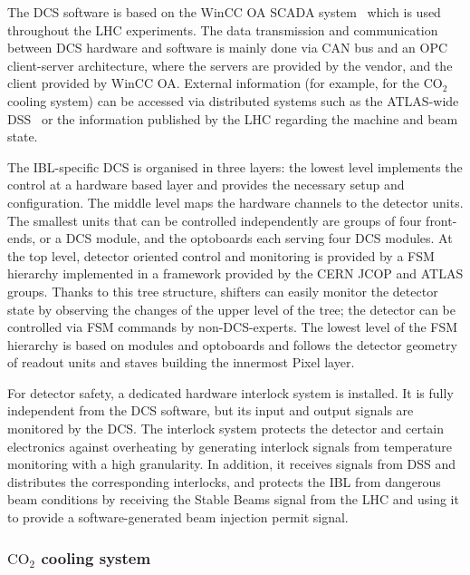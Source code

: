 \documentclass[cernpreprint, atlasdraft=false, UKenglish,british,orcidlogo, texmf, orcidlogo]{atlasdoc}
\begin{document}
The \gls{DCS} software is based on the \gls{WinCC OA} \gls{SCADA} system~\cite{PVSS} which is used throughout the \gls{LHC} experiments. The data transmission and communication between \gls{DCS} hardware and software is mainly done via \gls{CAN} bus and an \gls{OPC} client-server architecture, where the servers are provided by the vendor, and the client provided by \gls{WinCC OA}. External information (for example, for the ${\text{CO}}_2$ cooling system) can be accessed via distributed systems such as the ATLAS-wide \gls{DSS}~\cite{DSS} or the information published by the \gls{LHC} regarding the machine and beam state.
 
The \gls{IBL}-specific \gls{DCS} is organised in three layers: the lowest level implements the control at a hardware based layer and provides the necessary setup and configuration. The middle level maps the hardware channels to the detector units. The smallest units that can be controlled independently are groups of four front-ends, or a \gls{DCS} module, and the optoboards each serving four \gls{DCS} modules. At the top level, detector oriented control and monitoring is provided by a \gls{FSM} hierarchy implemented in a framework provided by the CERN \gls{JCOP} and ATLAS groups. Thanks to this tree structure, shifters can easily monitor the detector state by observing the changes of the upper level of the tree; the detector can be controlled via \gls{FSM} commands by non-\gls{DCS}-experts. The lowest level of the \gls{FSM} hierarchy is based on modules and optoboards and follows the detector geometry of readout units and staves building the innermost Pixel layer.
 
For detector safety, a dedicated hardware interlock system is installed. It is fully independent from the \gls{DCS} software,
but its input and output signals are monitored by the \gls{DCS}. The interlock system protects the detector and certain electronics against overheating by generating interlock signals from \analog temperature monitoring with a high granularity. In addition, it receives signals from \gls{DSS} and distributes the corresponding interlocks, and protects the \gls{IBL} from dangerous beam conditions by receiving the Stable Beams signal from the \gls{LHC} and using it to provide a software-generated beam injection permit signal.
 
\subsubsection{ ${\text{CO}}_2$ cooling system}
\label{sec:IBL-Cooling}
 
\end{document}

